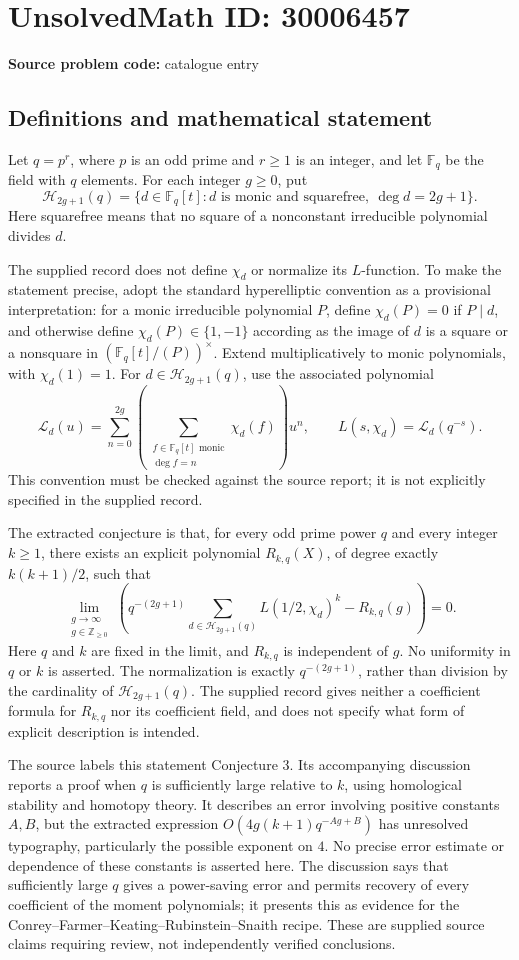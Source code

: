 \documentclass[11pt]{article}
\newcommand{\Z}{\mathbb{Z}}
\newcommand{\F}{\mathbb{F}}
\begin{document}
\section*{UnsolvedMath ID: 30006457}
\textbf{Source problem code:} catalogue entry
\subsection{Definitions and mathematical statement}
Let \(q=p^r\), where \(p\) is an odd prime and \(r\geq1\) is an integer, and let \(\F_q\) be the field with \(q\) elements. For each integer \(g\geq0\), put
\[
\mathcal H_{2g+1}(q)=\{d\in\F_q[t]:d\text{ is monic and squarefree},\ \deg d=2g+1\}.
\]
Here squarefree means that no square of a nonconstant irreducible polynomial divides \(d\).

The supplied record does not define \(\chi_d\) or normalize its \(L\)-function. To make the statement precise, adopt the standard hyperelliptic convention as a provisional interpretation: for a monic irreducible polynomial \(P\), define \(\chi_d(P)=0\) if \(P\mid d\), and otherwise define \(\chi_d(P)\in\{1,-1\}\) according as the image of \(d\) is a square or a nonsquare in \((\F_q[t]/(P))^\times\). Extend multiplicatively to monic polynomials, with \(\chi_d(1)=1\). For \(d\in\mathcal H_{2g+1}(q)\), use the associated polynomial
\[
\mathcal L_d(u)=\sum_{n=0}^{2g}\left(\sum_{\substack{f\in\F_q[t]\text{ monic}\\\deg f=n}}\chi_d(f)\right)u^n,
\qquad L(s,\chi_d)=\mathcal L_d(q^{-s}).
\]
This convention must be checked against the source report; it is not explicitly specified in the supplied record.

The extracted conjecture is that, for every odd prime power \(q\) and every integer \(k\geq1\), there exists an explicit polynomial \(R_{k,q}(X)\), of degree exactly \(k(k+1)/2\), such that
\[
\lim_{\substack{g\to\infty\\g\in\Z_{\geq0}}}
\left(q^{-(2g+1)}\sum_{d\in\mathcal H_{2g+1}(q)}L(1/2,\chi_d)^k-R_{k,q}(g)\right)=0.
\]
Here \(q\) and \(k\) are fixed in the limit, and \(R_{k,q}\) is independent of \(g\). No uniformity in \(q\) or \(k\) is asserted. The normalization is exactly \(q^{-(2g+1)}\), rather than division by the cardinality of \(\mathcal H_{2g+1}(q)\). The supplied record gives neither a coefficient formula for \(R_{k,q}\) nor its coefficient field, and does not specify what form of explicit description is intended.

The source labels this statement Conjecture 3. Its accompanying discussion reports a proof when \(q\) is sufficiently large relative to \(k\), using homological stability and homotopy theory. It describes an error involving positive constants \(A,B\), but the extracted expression \(O(4g(k+1)q^{-Ag+B})\) has unresolved typography, particularly the possible exponent on \(4\). No precise error estimate or dependence of these constants is asserted here. The discussion says that sufficiently large \(q\) gives a power-saving error and permits recovery of every coefficient of the moment polynomials; it presents this as evidence for the Conrey--Farmer--Keating--Rubinstein--Snaith recipe. These are supplied source claims requiring review, not independently verified conclusions.
\end{document}
